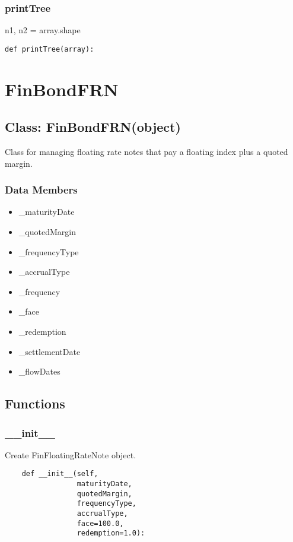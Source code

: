 \documentclass[twoside,11pt]{book}
\begin{document}
\subsubsection*{{\bf printTree}}
n1, n2 = array.shape 

\begin{lstlisting}
def printTree(array):
\end{lstlisting}

\newpage
\section{FinBondFRN}

\subsection*{Class: FinBondFRN(object)}
Class for managing floating rate notes that pay a floating index plus a quoted margin. 

\subsubsection*{Data Members}
\begin{itemize}
\item{\_maturityDate}
\item{\_quotedMargin}
\item{\_frequencyType}
\item{\_accrualType}
\item{\_frequency}
\item{\_face}
\item{\_redemption}
\item{\_settlementDate}
\item{\_flowDates}
\end{itemize}

\subsection*{Functions}

\subsubsection*{{\bf \_\_init\_\_}}
Create FinFloatingRateNote object.  

\begin{lstlisting}
    def __init__(self,
                 maturityDate,
                 quotedMargin,
                 frequencyType,
                 accrualType,
                 face=100.0,
                 redemption=1.0):
\end{lstlisting}
\end{document}
